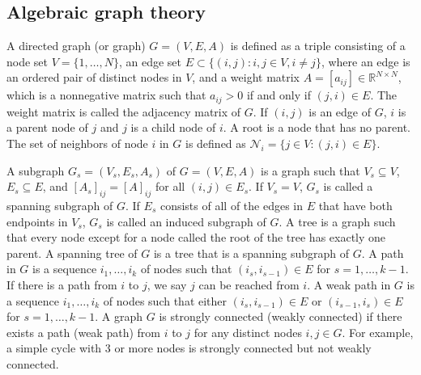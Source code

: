 \documentclass{ifacconf}
\begin{document}
\subsection{Algebraic graph theory}

A directed graph (or graph) ${G} = ({V}, {E}, A)$ is defined as a triple consisting of a node set $V = \{ 1, \ldots, N \}$, an edge set ${E} \subset \{ (i, j): i, j \in V, i \not =  j \}$, where an edge is an ordered pair of distinct nodes in $V$, and a weight matrix $A = [a_{ij}] \in \mathbb{R}^{N \times N}$, which is a nonnegative matrix such that $a_{ij} > 0$ if and only if $(j,i) \in E$. The weight matrix is called the adjacency matrix of $G$. 
If $(i, j)$ is an edge of $G$, $i$ is a parent node of $j$ and $j$ is a child node of $i$. A root is a node that has no parent. The set of neighbors of node $i$ in $G$ is defined as $\mathcal{N}_{i} = \{ j \in V: (j,i) \in E \}$. %

A subgraph $G_{s} = (V_{s}, E_{s}, A_{s})$ of $G = ({V}, {E}, A)$ is a graph such that $V_{s} \subseteq V$, $E_{s} \subseteq E$, and $[A_s]_{ij} = [A]_{ij}$ for all $(i,j) \in E_s$.  If $V_{s} = V$, $G_{s}$ is called a spanning subgraph of $G$. If $E_{s}$ consists of all of the edges in $E$ that have both endpoints in $V_{s}$, $G_{s}$ is called an induced subgraph of $G$. 
A tree is a graph such that every node except for a node called the root of the tree has exactly one parent. 
A spanning tree of $G$ is a tree that is a spanning subgraph of $G$. A path in $G$ is a sequence $i_{1},\ldots,i_{k}$ of nodes such that $(i_{s}, i_{s-1}) \in E$ for $s = 1,\ldots,k-1$. If there is a path from $i$ to $j$, we say $j$ can be reached from $i$. 
 A weak path in ${G}$ is a sequence $i_{1},\ldots, i_{k}$ of nodes such that either $(i_{s}, i_{s-1}) \in {E}$ or $(i_{s-1}, i_{s}) \in {E}$  for $s = 1,\ldots,k-1$. A graph ${G}$ is strongly connected (weakly connected) if there exists a path (weak path) from $i$ to $j$ for any distinct nodes $i,j \in {G}$. 
 For example, a simple cycle with 3 or more nodes is strongly connected but not weakly connected.
\end{document}
